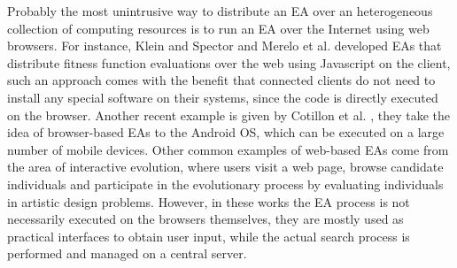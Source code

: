 Probably the most unintrusive way to distribute an EA over an heterogeneous collection of computing resources is to run an EA over the Internet using web browsers.
For instance, Klein and Spector \cite{spector:2007} and Merelo et al. \cite{merelo:2008} developed EAs that distribute fitness function evaluations over the web
using Javascript on the client, such an approach comes with the benefit that connected clients do not need to install any special software on their systems,
since the code is directly executed on the browser.
Another recent example is given by Cotillon et al. \cite{cotillon:2012}, they take the idea of browser-based EAs to the Android OS, which can be
executed on a large number of mobile devices.
Other common examples of web-based EAs come from the area of interactive evolution, where users visit a web page, browse candidate individuals
and participate in the evolutionary process by evaluating individuals in artistic design problems\cite{langdon:2004,picbreeder,Musart,Fire}.
However, in these works the EA process is not necessarily executed on the browsers themselves, they are mostly used as practical interfaces to obtain
user input, while the actual search process is performed and managed on a central server.


